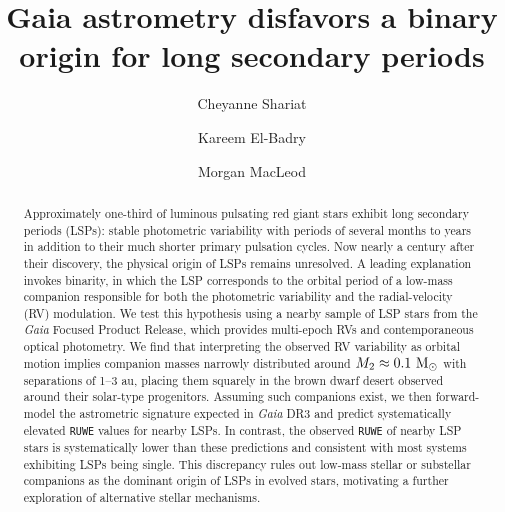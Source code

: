 \documentclass[trackchanges,twocolumn]{aastex631}
\begin{document}
\makeatletter
\let\frontmatter@title@above=\relax
\makeatother

\newcommand\lsim{\mathrel{\rlap{\lower4pt\hbox{\hskip1pt$\sim$}}
\raise1pt\hbox{$<$}}}
\newcommand\gsim{\mathrel{\rlap{\lower4pt\hbox{\hskip1pt$\sim$}}
\raise1pt\hbox{$>$}}}
\newcommand{\CS}[1]{{\color{red} CS: #1}}

\title{\Large Gaia astrometry disfavors a binary origin for long secondary periods}


\author[0000-0003-1247-9349]{Cheyanne Shariat}

\author[0000-0002-6871-1752]{Kareem El-Badry}

\author[0000-0002-1417-8024]{Morgan MacLeod}


\begin{abstract}
Approximately one-third of luminous pulsating red giant stars exhibit long secondary periods (LSPs): stable photometric variability with periods of several months to years in addition to their much shorter primary pulsation cycles.
Now nearly a century after their discovery, the physical origin of LSPs remains unresolved. A leading explanation invokes binarity, in which the LSP corresponds to the orbital period of a low-mass companion responsible for both the photometric variability and the radial-velocity (RV) modulation. We test this hypothesis using a nearby sample of LSP stars from the {\it Gaia} Focused Product Release, which provides multi-epoch RVs and contemporaneous optical photometry. We find that interpreting the observed RV variability as orbital motion implies companion masses narrowly distributed around $M_2 \approx 0.1~{\rm M_\odot}$ with separations of 1--3 au, placing them squarely in the brown dwarf desert observed around their solar-type progenitors.
Assuming such companions exist, we then forward-model the astrometric signature expected in {\it Gaia} DR3 and predict systematically elevated {\tt RUWE} values for nearby LSPs. In contrast, the observed {\tt RUWE} of nearby LSP stars is systematically lower than these predictions and consistent with most systems exhibiting LSPs being single. This discrepancy rules out low-mass stellar or substellar companions as the dominant origin of LSPs in evolved stars, motivating a further exploration of alternative stellar mechanisms.
\end{abstract}
\end{document}
